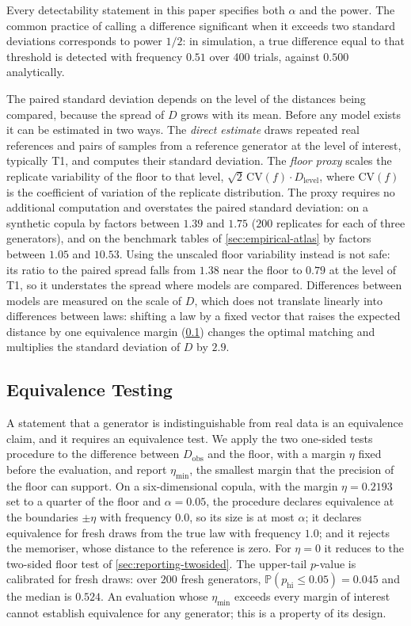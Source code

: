 \documentclass[twoside,11pt]{article}
\theoremstyle{plain}
\theoremstyle{definition}
\theoremstyle{remark}
\newcommand{\Prob}{\ensuremath{\mathbb{P}}}
\begin{document}
Every detectability statement in this paper specifies both $\alpha$ and
the power. The common practice of calling a difference significant when it
exceeds two standard deviations corresponds to power $1/2$: in simulation,
a true difference equal to that threshold is detected with frequency $0.51$ over 400 trials, against $0.500$ analytically.

The paired standard deviation depends on the level of the distances being
compared, because the spread of $D$ grows with its mean. Before any model
exists it can be estimated in two ways. The \emph{direct estimate} draws
repeated real references and pairs of samples from a reference generator
at the level of interest, typically T1, and computes their standard
deviation. The \emph{floor proxy} scales the replicate variability of the
floor to that level, $\sqrt{2}\,\mathrm{CV}(f) \cdot D_{\mathrm{level}}$,
where $\mathrm{CV}(f)$ is the coefficient of variation of the replicate
distribution. The proxy requires no additional computation and overstates
the paired standard deviation: on a synthetic copula by factors between
$1.39$ and $1.75$ ($200$ replicates for each of three generators), and on the
benchmark tables of \cref{sec:empirical-atlas} by factors between $1.05$ and
$10.53$. Using the unscaled floor variability instead is not safe: its ratio
to the paired spread falls from $1.38$ near the floor to $0.79$ at the level
of T1, so it understates the spread where models are compared. Differences
between models are measured on the scale of $D$, which does not translate
linearly into differences between laws: shifting a law by a fixed vector
that raises the expected distance by one equivalence margin
(\cref{sec:reporting-tost}) changes the optimal matching and multiplies the
standard deviation of $D$ by $2.9$.

\subsection{Equivalence Testing}\label{sec:reporting-tost}

A statement that a generator is indistinguishable from real data is an
equivalence claim, and it requires an equivalence test. We apply the two
one-sided tests procedure \citep{westlake1981,schuirmann1987} to the
difference between $D_{\mathrm{obs}}$ and the floor, with a margin
$\eta$ fixed before the evaluation, and report $\eta_{\min}$, the
smallest margin that the precision of the floor can support. On a
six-dimensional copula, with the margin $\eta = 0.2193$ set to a quarter of
the floor and $\alpha = 0.05$, the
procedure declares equivalence at the boundaries $\pm\eta$ with
frequency $0.0$, so its size is at most $\alpha$; it declares equivalence
for fresh draws from the true law with frequency $1.0$; and it rejects the
memoriser, whose distance to the reference is zero. For $\eta = 0$ it
reduces to the two-sided floor test of \cref{sec:reporting-twosided}. The
upper-tail $p$-value is calibrated for fresh draws: over $200$ fresh generators, $\Prob(p_{\mathrm{hi}} \leq 0.05) = 0.045$ and the median is $0.524$. An
evaluation whose $\eta_{\min}$ exceeds every margin of interest cannot
establish equivalence for any generator; this is a property of its design.
\end{document}
